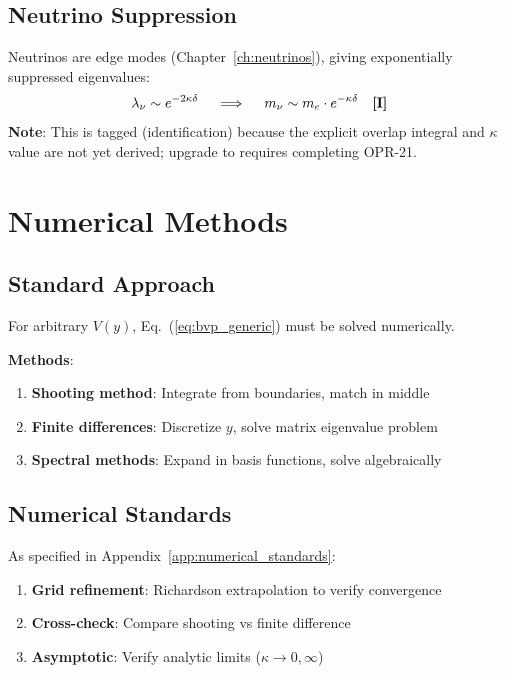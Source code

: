 \subsection{Neutrino Suppression}

Neutrinos are edge modes (Chapter~\ref{ch:neutrinos}), giving exponentially
suppressed eigenvalues:
\begin{equation}
\lambda_\nu \sim e^{-2\kappa\delta} \quad \implies \quad
m_\nu \sim m_e \cdot e^{-\kappa\delta} \quad \textbf{[I]}
\end{equation}
\textbf{Note}: This is tagged \tagI{} (identification) because the explicit overlap
integral and $\kappa$ value are not yet derived; upgrade to \tagDc{} requires
completing OPR-21.

\section{Numerical Methods}
\label{sec:numerical}

\subsection{Standard Approach}

For arbitrary $V(y)$, Eq.~(\ref{eq:bvp_generic}) must be solved numerically.

\textbf{Methods}:
\begin{enumerate}[nosep]
\item \textbf{Shooting method}: Integrate from boundaries, match in middle
\item \textbf{Finite differences}: Discretize $y$, solve matrix eigenvalue problem
\item \textbf{Spectral methods}: Expand in basis functions, solve algebraically
\end{enumerate}

\subsection{Numerical Standards}

As specified in Appendix~\ref{app:numerical_standards}:

\begin{enumerate}[nosep]
\item \textbf{Grid refinement}: Richardson extrapolation to verify convergence
\item \textbf{Cross-check}: Compare shooting vs finite difference
\item \textbf{Asymptotic}: Verify analytic limits ($\kappa \to 0, \infty$)
\end{enumerate}

